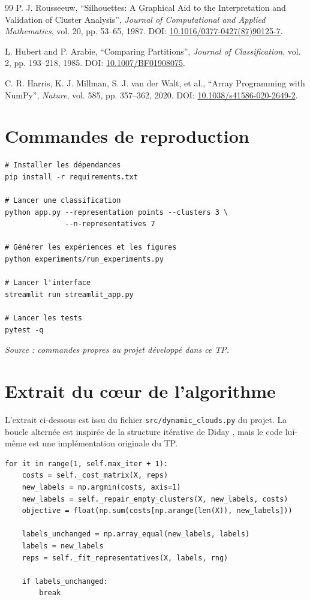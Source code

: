 \documentclass[12pt,a4paper]{article}
\begin{document}
\begin{thebibliography}{99}
P. J. Rousseeuw,
``Silhouettes: A Graphical Aid to the Interpretation and Validation of Cluster Analysis'',
\textit{Journal of Computational and Applied Mathematics}, vol. 20, pp. 53--65, 1987.
DOI: \href{https://doi.org/10.1016/0377-0427(87)90125-7}{10.1016/0377-0427(87)90125-7}.

L. Hubert and P. Arabie,
``Comparing Partitions'',
\textit{Journal of Classification}, vol. 2, pp. 193--218, 1985.
DOI: \href{https://doi.org/10.1007/BF01908075}{10.1007/BF01908075}.

C. R. Harris, K. J. Millman, S. J. van der Walt, et al.,
``Array Programming with NumPy'',
\textit{Nature}, vol. 585, pp. 357--362, 2020.
DOI: \href{https://doi.org/10.1038/s41586-020-2649-2}{10.1038/s41586-020-2649-2}.

\end{thebibliography}

\appendix
\section{Commandes de reproduction}

\begin{lstlisting}[basicstyle=\ttfamily\footnotesize]
# Installer les dépendances
pip install -r requirements.txt

# Lancer une classification
python app.py --representation points --clusters 3 \
              --n-representatives 7

# Générer les expériences et les figures
python experiments/run_experiments.py

# Lancer l'interface
streamlit run streamlit_app.py

# Lancer les tests
pytest -q
\end{lstlisting}

\noindent\textit{Source : commandes propres au projet développé dans ce TP.}

\section{Extrait du cœur de l'algorithme}

L'extrait ci-dessous est issu du fichier \texttt{src/dynamic\_clouds.py} du projet. La boucle alternée est inspirée de la structure itérative de Diday \cite[p.~21]{diday1971}, mais le code lui-même est une implémentation originale du TP.

\begin{lstlisting}[basicstyle=\ttfamily\footnotesize]
for it in range(1, self.max_iter + 1):
    costs = self._cost_matrix(X, reps)
    new_labels = np.argmin(costs, axis=1)
    new_labels = self._repair_empty_clusters(X, new_labels, costs)
    objective = float(np.sum(costs[np.arange(len(X)), new_labels]))

    labels_unchanged = np.array_equal(new_labels, labels)
    labels = new_labels
    reps = self._fit_representatives(X, labels, rng)

    if labels_unchanged:
        break
\end{lstlisting}
\end{document}
